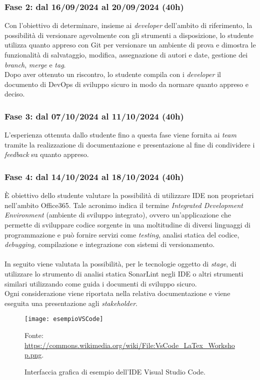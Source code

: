 \subsubsection*{Fase 2: dal 16/09/2024 al 20/09/2024 (40h) }
Con l'obiettivo di determinare, insieme ai \emph{developer} dell'ambito di riferimento, la possibilità di versionare agevolmente con gli strumenti a disposizione, lo studente utilizza quanto appreso con Git per versionare un ambiente di prova e dimostra le funzionalità di salvataggio, modifica, assegnazione di autori e date, gestione dei \emph{branch}, \emph{merge} e \emph{tag}.\\
Dopo aver ottenuto un riscontro, lo studente compila con i \emph{developer} il documento di \gls{DevOps} di sviluppo sicuro in modo da normare quanto appreso e deciso.

\subsubsection*{Fase 3: dal 07/10/2024 al 11/10/2024 (40h) }
L'esperienza ottenuta dallo studente fino a questa fase viene fornita ai \emph{team} tramite la realizzazione di documentazione e presentazione al fine di condividere i \emph{feedback} su quanto appreso.

\subsubsection*{Fase 4: dal 14/10/2024 al 18/10/2024 (40h) }
È obiettivo dello studente valutare la possibilità di utilizzare IDE non proprietari nell'ambito Office365. Tale acronimo indica il termine \emph{Integrated Development Environment} (ambiente di sviluppo integrato), ovvero un'applicazione che permette di sviluppare codice sorgente in una moltitudine di diversi linguaggi di programmazione e può fornire servizi come \emph{testing}, analisi statica del codice, \emph{debugging}, compilazione e integrazione con sistemi di versionamento.\\\\
In seguito viene valutata la possibilità, per le tecnologie oggetto di \emph{stage}, di utilizzare lo strumento di analisi statica SonarLint negli IDE o altri strumenti similari utilizzando come guida i documenti di sviluppo sicuro.\\
Ogni considerazione viene riportata nella relativa documentazione e viene eseguita una presentazione agli \emph{stakeholder}.
\begin{figure}[htbp] 
    \centering 
    \texttt{[image: esempioVSCode]}
    \caption{Interfaccia grafica di esempio dell'IDE Visual Studio Code.} 
    \label{fig:esempioVSCode}
    \vspace{1mm}
    Fonte: \url{https://commons.wikimedia.org/wiki/File:VsCode_LaTex_Workshop.png}.
\end{figure}
